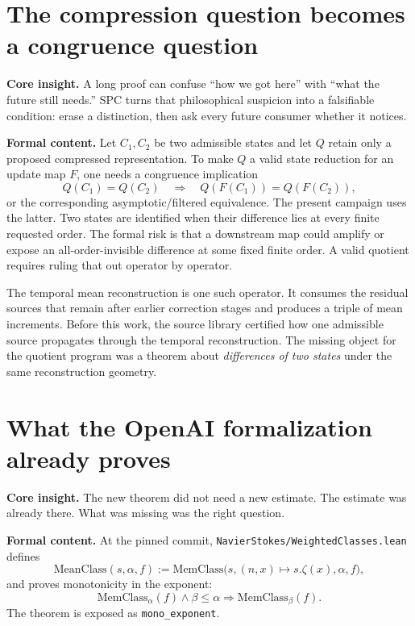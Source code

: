 \documentclass[11pt]{article}
\theoremstyle{highend}
\theoremstyle{definition}
\newcommand{\MeanClass}{\mathrm{MeanClass}}
\begin{document}
\tableofcontents
\clearpage

\section{The compression question becomes a congruence question}
\begin{eurekabox}
\textbf{Core insight.} A long proof can confuse ``how we got here'' with ``what the future still needs.'' SPC turns that philosophical suspicion into a falsifiable condition: erase a distinction, then ask every future consumer whether it notices.
\end{eurekabox}
\noindent\textbf{Formal content.}
Let \(C_1,C_2\) be two admissible states and let \(Q\) retain only a proposed compressed representation. To make \(Q\) a valid state reduction for an update map \(F\), one needs a congruence implication
\[
Q(C_1)=Q(C_2)\quad\Longrightarrow\quad Q(F(C_1))=Q(F(C_2)),
\]
or the corresponding asymptotic/filtered equivalence. The present campaign uses the latter. Two states are identified when their difference lies at every finite requested order. The formal risk is that a downstream map could amplify or expose an all-order-invisible difference at some fixed finite order. A valid quotient requires ruling that out operator by operator.

The temporal mean reconstruction is one such operator. It consumes the residual sources that remain after earlier correction stages and produces a triple of mean increments. Before this work, the source library certified how one admissible source propagates through the temporal reconstruction. The missing object for the quotient program was a theorem about \emph{differences of two states} under the same reconstruction geometry.

\section{What the OpenAI formalization already proves}
\begin{eurekabox}
\textbf{Core insight.} The new theorem did not need a new estimate. The estimate was already there. What was missing was the right question.
\end{eurekabox}
\noindent\textbf{Formal content.}
At the pinned commit, \texttt{NavierStokes/WeightedClasses.lean} defines
\[
\MeanClass(s,\alpha,f):=\mathrm{MemClass}\bigl(s,(n,x)\mapsto s.\zeta(x),\alpha,f\bigr),
\]
and proves monotonicity in the exponent:
\[
\mathrm{MemClass}_\alpha(f)\wedge \beta\le \alpha
\Longrightarrow \mathrm{MemClass}_\beta(f).
\]
The theorem is exposed as \texttt{mono\_exponent}.
\end{document}

